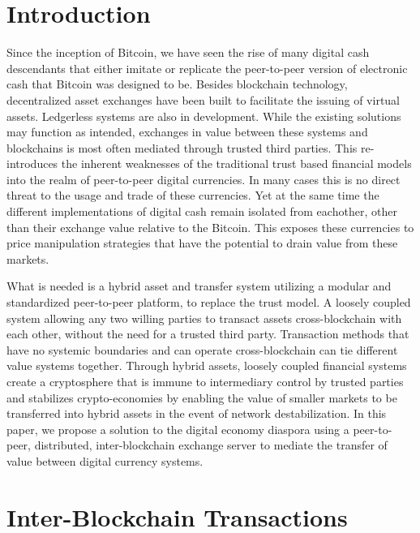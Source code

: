 \documentclass[a4paper]{article}
\begin{document}
\section{Introduction}
Since the inception of Bitcoin, we have seen the rise of many digital cash descendants that either imitate or replicate the peer-to-peer version of electronic cash that Bitcoin was designed to be. Besides blockchain technology, decentralized asset exchanges\cite{counterparty} have been built to facilitate the issuing of virtual assets. Ledgerless \cite{opentransactions} systems are also in development. While the existing solutions may function as intended, exchanges in value between these systems and blockchains is most often mediated through trusted third parties. This re-introduces the inherent weaknesses of the traditional trust based financial models into the realm of peer-to-peer digital currencies. In many cases this is no direct threat to the usage and trade of these currencies. Yet at the same time the different implementations of digital cash remain isolated from eachother, other than their exchange value relative to the Bitcoin. This exposes these currencies to price manipulation strategies that have the potential to drain value from these markets. \cite{panture}

What is needed is a hybrid asset and transfer system utilizing a modular and standardized peer-to-peer platform, to replace the trust model. A loosely coupled system\cite{EDA} allowing any two willing parties to transact assets cross-blockchain with each other, without the need for a trusted third party. Transaction methods that have no systemic boundaries and can operate cross-blockchain can tie different value systems together. Through hybrid assets, loosely coupled financial systems create a cryptosphere that is immune to intermediary control by trusted parties and stabilizes crypto-economies by enabling the value of smaller markets to be transferred into hybrid assets in the event of network destabilization. In this paper, we propose a solution to the digital economy diaspora using a peer-to-peer, distributed, inter-blockchain exchange server to mediate the transfer of value between digital currency systems.

\section{Inter-Blockchain Transactions}
\end{document}
